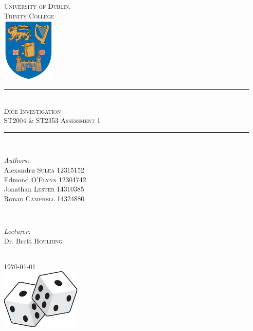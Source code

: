 \documentclass[12pt]{article}
\begin{document}
\begin{titlepage}

\newcommand{\HRule}{\rule{\linewidth}{0.5mm}}

\center
\textsc{\LARGE University of Dublin,\\Trinity College}\\[1.0cm]
\includegraphics[width=0.2\textwidth]{logo.png}

\HRule \\[0.4cm]
\textsc{\Large Dice Investigation}\\[0.25cm]
\textsc{\large ST2004 \& ST2353 Assessment 1}\\[0.1cm]
\HRule \\[0.4cm]
 
\begin{minipage}{0.5\textwidth}
\begin{flushleft} \large
\emph{Authors:}
\\Alexandru \textsc{Sulea} 12315152
\\Edmond \textsc{O'Flynn} 12304742
\\Jonathan \textsc{Lester} 14310385
\\Ronan \textsc{Campbell} 14324880
\end{flushleft}
\end{minipage}
~
\begin{minipage}{0.4\textwidth}
\begin{flushleft} 
\large
\emph{Lecturer:} \\
Dr. Brett \textsc{Houlding}
\vspace{1.9cm}
\end{flushleft}
\end{minipage}\\[2cm]

{\large \today}\\[1cm] 

\includegraphics[width=0.3\textwidth]{dice.png}
\clearpage
\end{titlepage}
\end{document}
